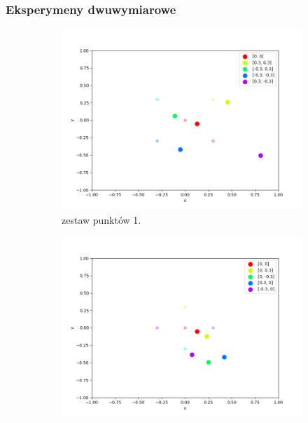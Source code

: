 \subsubsection{Eksperymeny dwuwymiarowe}

\begin{figure}[h]
\centering
\begin{subfigure}{.5\textwidth}
    \centering
    \includegraphics[width=\linewidth]{pics/mult_lat_2d/positions_1_mean.png}
\caption{zestaw punktów 1.}
\label{pic:2d_1_mult}
\end{subfigure}%
\begin{subfigure}{.5\textwidth}
    \centering
    \includegraphics[width=\linewidth]{pics/mult_lat_2d/positions_2_mean.png}

\end{subfigure}
\end{figure}

